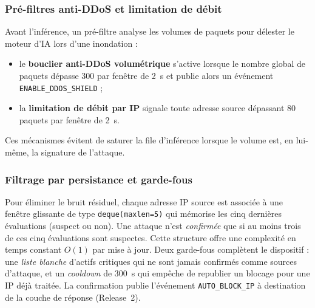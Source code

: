 
\subsubsection{Pré-filtres anti-DDoS et limitation de débit}

Avant l'inférence, un pré-filtre analyse les volumes de paquets pour délester le moteur d'IA lors d'une inondation :
\begin{itemize}
  \item le \textbf{bouclier anti-DDoS volumétrique} s'active lorsque le nombre global de paquets dépasse \num{300} par fenêtre de \SI{2}{\second} et publie alors un événement \texttt{ENABLE\_DDOS\_SHIELD} ;
  \item la \textbf{limitation de débit par IP} signale toute adresse source dépassant \num{80} paquets par fenêtre de \SI{2}{\second}.
\end{itemize}
Ces mécanismes évitent de saturer la file d'inférence lorsque le volume est, en lui-même, la signature de l'attaque.

\subsubsection{Filtrage par persistance et garde-fous}

Pour éliminer le bruit résiduel, chaque adresse IP source est associée à une fenêtre glissante de type \texttt{deque(maxlen=5)} qui mémorise les cinq dernières évaluations (suspect ou non). Une attaque n'est \emph{confirmée} que si au moins trois de ces cinq évaluations sont suspectes. Cette structure offre une complexité en temps constant $O(1)$ par mise à jour. Deux garde-fous complètent le dispositif : une \emph{liste blanche} d'actifs critiques qui ne sont jamais confirmés comme sources d'attaque, et un \emph{cooldown} de \SI{300}{\second} qui empêche de republier un blocage pour une IP déjà traitée. La confirmation publie l'événement \texttt{AUTO\_BLOCK\_IP} à destination de la couche de réponse (Release~2).

